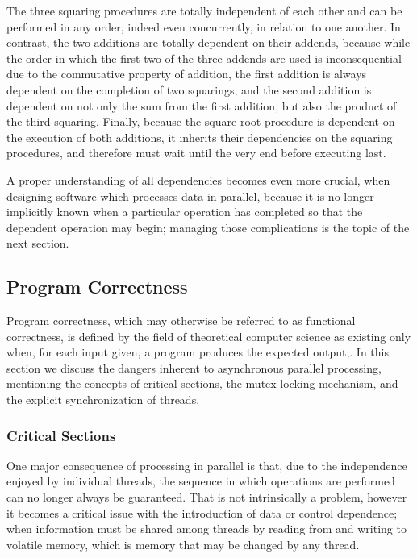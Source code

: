 The three squaring procedures are totally independent of each other and can be performed in any order, indeed even concurrently, in relation to one another. In contrast, the two additions are totally dependent on their addends, because while the order in which the first two of the three addends are used is inconsequential due to the commutative property of addition, the first addition is always dependent on the completion of two squarings, and the second addition is dependent on not only the sum from the first addition, but also the product of the third squaring. Finally, because the square root procedure is dependent on the execution of both additions, it inherits their dependencies on the squaring procedures, and therefore must wait until the very end before executing last.

A proper understanding of all dependencies becomes even more crucial, when designing software which processes data in parallel, because it is no longer implicitly known when a particular operation has completed so that the dependent operation may begin; managing those complications is the topic of the next section.

%
%
%
%
\subsection{Program Correctness}
\label{ch2sPPssPC}
Program correctness, which may otherwise be referred to as functional correctness, is defined by the field of theoretical computer science as existing only when, for each input given, a program produces the expected output,. In this section we discuss the dangers inherent to asynchronous parallel processing, mentioning the concepts of critical sections, the mutex locking mechanism, and the explicit synchronization of threads.

%
%
\subsubsection{Critical Sections}
\label{ch2sPPssPCsssCS}
One major consequence of processing in parallel is that, due to the independence enjoyed by individual threads, the sequence in which operations are performed can no longer always be guaranteed. That is not intrinsically a problem, however it becomes a critical issue with the introduction of data or control dependence; when information must be shared among threads by reading from and writing to volatile memory, which is memory that may be changed by any thread.

